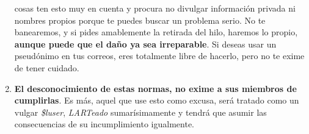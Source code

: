\documentclass[a4paper,12pt]{book}
\begin{document}
\begin{enumerate}[1.]
  cosas ten esto muy en cuenta y procura no divulgar información privada
  ni nombres propios porque te puedes buscar un problema serio. No te
  banearemos, y si pides amablemente la retirada del hilo, haremos lo
  propio, \textbf{aunque puede que el daño ya sea irreparable}. Si
  deseas usar un pseudónimo en tus correos, eres totalmente libre de
  hacerlo, pero no te exime de tener cuidado.
\item
  \textbf{El desconocimiento de estas normas, no exime a sus miembros de
  cumplirlas}. Es más, aquel que use esto como excusa, será tratado como
  un vulgar \emph{\$luser}, \emph{LARTeado} sumarísimamente y tendrá que
  asumir las consecuencias de su incumplimiento igualmente.
\end{enumerate}
\end{document}
